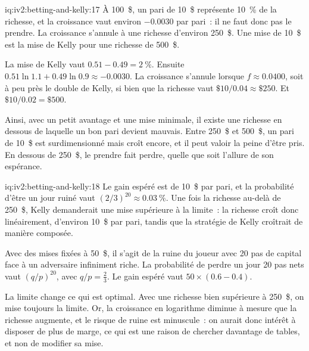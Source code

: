 \begin{solution}{iq:iv2:betting-and-kelly:17}
À 100~\$, un pari de 10~\$ représente 10~\% de la richesse, et la croissance vaut environ $-0.0030$ par pari~: il ne faut donc pas le prendre. La croissance s'annule à une richesse d'environ 250~\$. Une mise de 10~\$ est la mise de Kelly pour une richesse de 500~\$.

La mise de Kelly vaut $0.51 - 0.49 = 2~\%$. Ensuite $0.51\ln 1.1 + 0.49\ln 0.9 \approx -0.0030$. La croissance s'annule lorsque $f \approx 0.0400$, soit à peu près le double de Kelly, si bien que la richesse vaut $\$10/0.04 \approx \$250$. Et $\$10/0.02 = \$500$.

Ainsi, avec un petit avantage et une mise minimale, il existe une richesse en dessous de laquelle un bon pari devient mauvais. Entre 250~\$ et 500~\$, un pari de 10~\$ est surdimensionné mais croît encore, et il peut valoir la peine d'être pris. En dessous de 250~\$, le prendre fait perdre, quelle que soit l'allure de son espérance.

\end{solution}

\begin{solution}{iq:iv2:betting-and-kelly:18}
Le gain espéré est de 10~\$ par pari, et la probabilité d'être un jour ruiné vaut $(2/3)^{20} \approx 0.03~\%$. Une fois la richesse au-delà de 250~\$, Kelly demanderait une mise supérieure à la limite~: la richesse croît donc linéairement, d'environ 10~\$ par pari, tandis que la stratégie de Kelly croîtrait de manière composée.

Avec des mises fixées à 50~\$, il s'agit de la ruine du joueur avec 20 pas de capital face à un adversaire infiniment riche. La probabilité de perdre un jour 20 pas nets vaut $(q/p)^{20}$, avec $q/p = \tfrac23$. Le gain espéré vaut $50 \times (0.6 - 0.4)$.

La limite change ce qui est optimal. Avec une richesse bien supérieure à 250~\$, on mise toujours la limite. Or, la croissance en logarithme diminue à mesure que la richesse augmente, et le risque de ruine est minuscule~: on aurait donc intérêt à disposer de plus de marge, ce qui est une raison de chercher davantage de tables, et non de modifier sa mise.

\end{solution}

